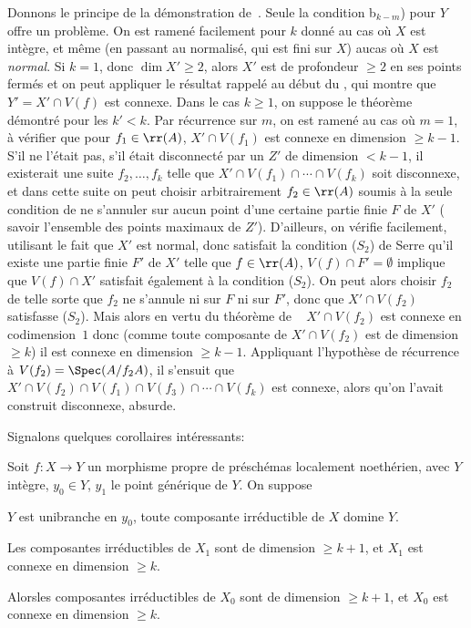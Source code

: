 Donnons le principe de la d\'emonstration de~. Seule la condition b$_{k-m}$) pour $Y$ offre un probl\`eme. On est ramen\'e facilement pour $k$ donn\'e au cas o\`u $X$ est int\`egre, et m\^eme (en passant au normalis\'e, qui est fini sur $X$) au\pageoriginale cas o\`u $X$ est \emph{normal}. Si $k=1$, donc $\dim X' \ge 2$, alors $X'$ est de profondeur $\ge 2$ en ses points ferm\'es et on peut appliquer le r\'esultat rappel\'e au d\'ebut du , qui montre que \hbox{$Y'=X'\cap V(f)$} est connexe. Dans le cas $k\ge 1$, on suppose le th\'eor\`eme d\'emontr\'e pour les \hbox{$k'\!<\!k$}. Par r\'ecurrence sur $m$, on est ramen\'e au cas o\`u $m=1$, \ie \`a v\'erifier que pour $f_1\in\nobreak \rr(A)$, $X'\cap V(f_1)$ est connexe en dimension $\ge k-1$. S'il ne l'\'etait pas, \ie s'il \'etait disconnect\'e par un $Z'$ de dimension $< k-1$, il existerait une suite $f_2, \dotsc, f_k$ telle que \hbox{$X'\cap V(f_1)\cap\dotsb\cap V(f_k)$} soit disconnexe, et dans cette suite on peut choisir arbitrairement $f_2\in \rr(A)$ soumis \`a la seule condition de ne s'annuler sur aucun point d'une certaine partie finie $F$ de $X'$ ( savoir l'ensemble des points maximaux de $Z'$). D'ailleurs, on v\'erifie facilement, utilisant le fait que $X'$ est normal, donc satisfait la condition ({$S_2$}) de Serre qu'il existe une partie finie $F'$ de $X'$ telle que $f\in \rr(A)$, $V(f)\cap F'=\emptyset$ implique que $V(f)\cap X'$ satisfait \'egalement \`a la condition ({$S_2$}). On peut alors choisir $f_2$ de telle sorte que $f_2$ ne s'annule ni sur $F$ ni sur $F'$, donc que $X'\cap V(f_2)$ satisfasse ({$S_2$}). Mais alors\sisi{}{,} en vertu du th\'eor\`eme de  ~\sisi{}{,} $X'\cap V(f_2)$ est connexe en codimension~$1$ donc (comme toute composante de $X'\cap V(f_2)$ est de dimension $\ge k$) il est connexe en dimension $\ge k-1$. Appliquant l'hypoth\`ese de r\'ecurrence \`a $V(f_2)=\Spec(A/f_2A)$, il s'ensuit que $X'\cap V(f_2)\cap V(f_1)\cap V(f_3)\cap \dotsb\cap V(f_k)$ est connexe, alors qu'on l'avait construit disconnexe, absurde.

Signalons quelques corollaires int\'eressants:

\begin{corollaire} \label{XIII.2.2}
Soit $f\colon X\to Y$ un morphisme propre de pr\'esch\'emas localement noeth\'erien, avec $Y$ int\`egre, $y_0\in Y$, $y_1$ le point g\'en\'erique de $Y$. On suppose
\begin{enumeratea}
\item
$Y$ est unibranche en $y_0$, toute composante irr\'eductible de $X$ domine $Y$.
\item
Les composantes irr\'eductibles de $X_1$ sont de dimension $\ge k+1$, et $X_1$ est connexe en dimension $\ge k$.
\end{enumeratea}

Alors\pageoriginale les composantes irr\'eductibles de $X_0$ sont de dimension $\ge k+1$, et $X_0$ est connexe en dimension $\ge k$.
\end{corollaire}


